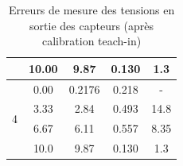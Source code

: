 \begin{table}[H]
\begin{tabular}{|c|c|c|c|c|}
                           & 10.00             & 9.87            & 0.130  & 1.3                      \\ \hline
        \multirow{4}{*}{4} & 0.00              & 0.2176          & 0.218  & -                        \\ \cline{2-5}
                           & 3.33              & 2.84            & 0.493  & 14.8                     \\ \cline{2-5}
                           & 6.67              & 6.11            & 0.557  & 8.35                     \\ \cline{2-5}
                           & 10.0              & 9.87            & 0.130  & 1.3                      \\ \hline
    \end{tabular}
    \caption{Erreurs de mesure des tensions en sortie des capteurs (après calibration teach-in)}
    \label{tab:teachin_3_capteurs}
\end{table}


